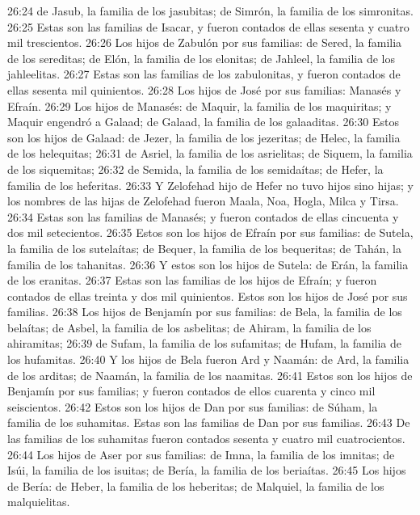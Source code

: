 26:24 de Jasub, la familia de los jasubitas; de Simrón, la familia de los simronitas.  
26:25 Estas son las familias de Isacar, y fueron contados de ellas sesenta y cuatro mil trescientos.  
26:26 Los hijos de Zabulón por sus familias: de Sered, la familia de los sereditas; de Elón, la familia de los elonitas; de Jahleel, la familia de los jahleelitas.  
26:27 Estas son las familias de los zabulonitas, y fueron contados de ellas sesenta mil quinientos.  
26:28 Los hijos de José por sus familias: Manasés y Efraín.  
26:29 Los hijos de Manasés: de Maquir, la familia de los maquiritas; y Maquir engendró a Galaad; de Galaad, la familia de los galaaditas.  
26:30 Estos son los hijos de Galaad: de Jezer, la familia de los jezeritas; de Helec, la familia de los helequitas;  
26:31 de Asriel, la familia de los asrielitas; de Siquem, la familia de los siquemitas;  
26:32 de Semida, la familia de los semidaítas; de Hefer, la familia de los heferitas.  
26:33 Y Zelofehad hijo de Hefer no tuvo hijos sino hijas; y los nombres de las hijas de Zelofehad fueron Maala, Noa, Hogla, Milca y Tirsa.  
26:34 Estas son las familias de Manasés; y fueron contados de ellas cincuenta y dos mil setecientos.  
26:35 Estos son los hijos de Efraín por sus familias: de Sutela, la familia de los sutelaítas; de Bequer, la familia de los bequeritas; de Tahán, la familia de los tahanitas.  
26:36 Y estos son los hijos de Sutela: de Erán, la familia de los eranitas.  
26:37 Estas son las familias de los hijos de Efraín; y fueron contados de ellas treinta y dos mil quinientos. Estos son los hijos de José por sus familias.  
26:38 Los hijos de Benjamín por sus familias: de Bela, la familia de los belaítas; de Asbel, la familia de los asbelitas; de Ahiram, la familia de los ahiramitas;  
26:39 de Sufam, la familia de los sufamitas; de Hufam, la familia de los hufamitas.  
26:40 Y los hijos de Bela fueron Ard y Naamán: de Ard, la familia de los arditas; de Naamán, la familia de los naamitas.  
26:41 Estos son los hijos de Benjamín por sus familias; y fueron contados de ellos cuarenta y cinco mil seiscientos.  
26:42 Estos son los hijos de Dan por sus familias: de Súham, la familia de los suhamitas. Estas son las familias de Dan por sus familias.  
26:43 De las familias de los suhamitas fueron contados sesenta y cuatro mil cuatrocientos.  
26:44 Los hijos de Aser por sus familias: de Imna, la familia de los imnitas; de Isúi, la familia de los isuitas; de Bería, la familia de los beriaítas.  
26:45 Los hijos de Bería: de Heber, la familia de los heberitas; de Malquiel, la familia de los malquielitas.  
